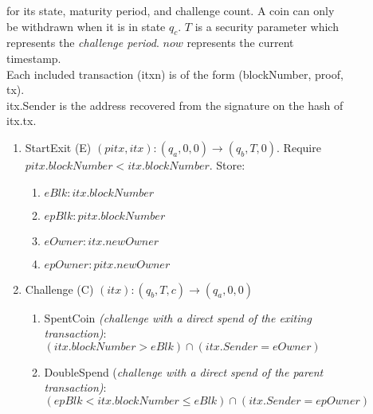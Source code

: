 \begin{figure}
\begin{minipage}{\columnwidth}
\begin{framed}
     for its state, maturity period, and challenge count. A coin can only be withdrawn when it is in state $q_c$. $T$ is a security parameter which represents the \textit{challenge period}. $now$ represents the current timestamp. \\ Each included transaction (itxn) is of the form (blockNumber, proof, tx). \\ itx.Sender is the address recovered from the signature on the hash of itx.tx.



    \begin{enumerate}
        \item StartExit (E) $(pitx, itx): (q_a, 0, 0) \rightarrow (q_b, T, 0)$. Require $pitx.blockNumber < itx.blockNumber$. Store:
            \begin{enumerate}
                \item $eBlk: itx.blockNumber$
                \item $epBlk: pitx.blockNumber$
                \item $eOwner: itx.newOwner$
                \item $epOwner: pitx.newOwner$
            \end{enumerate}
        \item Challenge (C) $(itx): (q_b, T, c) \rightarrow (q_a, 0, 0)$
            \begin{enumerate}
                \item SpentCoin \textit{(challenge with a direct spend of the exiting transaction)}: $(itx.blockNumber > eBlk) \cap (itx.Sender = eOwner)$
                \item DoubleSpend (\textit{challenge with a direct spend of the parent transaction)}: $(epBlk < itx.blockNumber \leq eBlk) \cap (itx.Sender = epOwner)$ 


\end{enumerate}
\end{enumerate}
\end{framed}
\end{minipage}
\end{figure}
